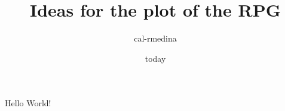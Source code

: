 \documentclass{article}
\title{Ideas for the plot of the RPG}
\date{today}
\author{cal-rmedina}
\begin{document}
  \maketitle
  \newpage

  Hello World!
\end{document}

